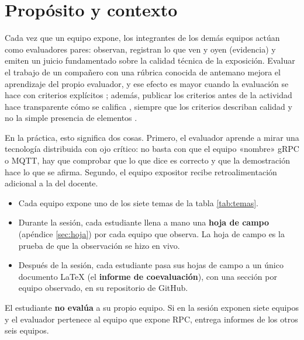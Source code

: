 \documentclass[11pt,a4paper]{article}
\begin{document}
\tableofcontents
\newpage

\section{Propósito y contexto}

Cada vez que un equipo expone, los integrantes de los demás equipos actúan como evaluadores pares: observan, registran lo que ven y oyen (evidencia) y emiten un juicio fundamentado sobre la calidad técnica de la exposición. Evaluar el trabajo de un compañero con una rúbrica conocida de antemano mejora el aprendizaje del propio evaluador, y ese efecto es mayor cuando la evaluación se hace con criterios explícitos \cite{double2020impact}; además, publicar los criterios antes de la actividad hace transparente cómo se califica \cite{panadero2020critical}, siempre que los criterios describan calidad y no la simple presencia de elementos \cite{brookhart2018appropriate}.

En la práctica, esto significa dos cosas. Primero, el evaluador aprende a mirar una tecnología distribuida con ojo crítico: no basta con que el equipo «nombre» gRPC o MQTT, hay que comprobar que lo que dice es correcto y que la demostración hace lo que se afirma. Segundo, el equipo expositor recibe retroalimentación adicional a la del docente.

\begin{infoBox}[title={Cómo se organiza la sesión}]
	\begin{itemize}
		\item Cada equipo expone uno de los siete temas de la tabla \ref{tab:temas}.
		\item Durante la sesión, cada estudiante llena a mano una \textbf{hoja de campo} (apéndice \ref{sec:hoja}) por cada equipo que observa. La hoja de campo es la prueba de que la observación se hizo en vivo.
		\item Después de la sesión, cada estudiante pasa sus hojas de campo a un único documento \LaTeX{} (el \textbf{informe de coevaluación}), con una sección por equipo observado, en su repositorio de GitHub.
	\end{itemize}
\end{infoBox}

\begin{infoBox}[title={Regla de exclusión}]
	El estudiante \textbf{no evalúa} a su propio equipo. Si en la sesión exponen siete equipos y el evaluador pertenece al equipo que expone RPC, entrega informes de los otros seis equipos.
\end{infoBox}
\end{document}

